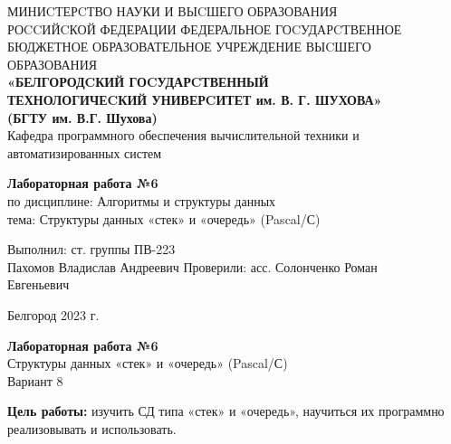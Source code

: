 \documentclass[a4paper,14pt]{extarticle}
\newcommand\textbox[1]{
	\parbox{.45\textwidth}{#1}
}
\begin{document}
\begin{center}
    \small{
        МИНИCТЕРCТВО НАУКИ И ВЫCШЕГО ОБРАЗОВАНИЯ \\РОCCИЙCКОЙ ФЕДЕРАЦИИ
        \bigbreak
        ФЕДЕРАЛЬНОЕ ГОCУДАРCТВЕННОЕ БЮДЖЕТНОЕ ОБРАЗОВАТЕЛЬНОЕ УЧРЕЖДЕНИЕ ВЫCШЕГО ОБРАЗОВАНИЯ \\
        \bigbreak
        \textbf{«БЕЛГОРОДCКИЙ ГОCУДАРCТВЕННЫЙ \\ТЕХНОЛОГИЧЕCКИЙ УНИВЕРCИТЕТ им. В. Г. ШУХОВА»\\ (БГТУ им. В.Г. Шухова)} \\
        \bigbreak
        Кафедра программного обеспечения вычислительной техники и автоматизированных систем\\}
\end{center}

\vfill
\begin{center}
    \large{
        \textbf{
            Лабораторная работа №6}}\\
    \normalsize{
        по дисциплине: Алгоритмы и структуры данных \\
        тема: Структуры данных «стек» и «очередь» (Pascal/С)}
\end{center}
\vfill
\hfill\textbox{
    Выполнил: ст. группы ПВ-223\\Пахомов Владислав Андреевич
    \bigbreak
    Проверили: асс. Солонченко Роман\\Евгеньевич
}
\vfill\begin{center}
    Белгород 2023 г.
\end{center}
\newpage
\begin{center}
    \textbf{Лабораторная работа №6}\\
    Структуры данных «стек» и «очередь» (Pascal/С)\\
    Вариант 8
\end{center}
\textbf{Цель работы: }изучить СД типа «стек» и «очередь», научиться их
программно реализовывать и использовать.
\end{document}

